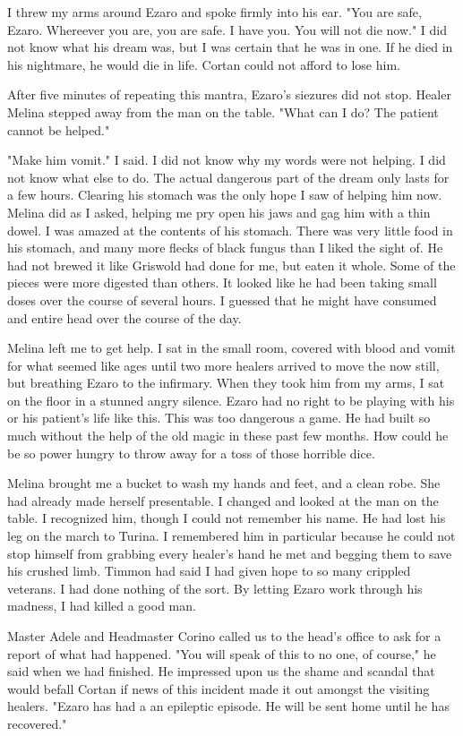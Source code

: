 \documentclass{article}
\begin{document}
I threw my arms around Ezaro and spoke firmly into his ear. "You are safe, Ezaro. Whereever you are, you are safe. I have you. You will not die now." I did not know what his dream was, but I was certain that he was in one. If he died in his nightmare, he would die in life. Cortan could not afford to lose him. 

After five minutes of repeating this mantra, Ezaro's siezures did not stop. Healer Melina stepped away from the man on the table. "What can I do? The patient cannot be helped." 

"Make him vomit." I said. I did not know why my words were not helping. I did not know what else to do. The actual dangerous part of the dream only lasts for a few hours. Clearing his stomach was the only hope I saw of helping him now. Melina did as I asked, helping me pry open his jaws and gag him with a thin dowel. I was amazed at the contents of his stomach. There was very little food in his stomach, and many more flecks of black fungus than I liked the sight of. He had not brewed it like Griswold had done for me, but eaten it whole. Some of the pieces were more digested than others. It looked like he had been taking small doses over the course of several hours. I guessed that he might have consumed and entire head over the course of the day.

Melina left me to get help. I sat in the small room, covered with blood and vomit for what seemed like ages until two more healers arrived to move the now still, but breathing Ezaro to the infirmary. When they took him from my arms, I sat on the floor in a stunned angry silence. Ezaro had no right to be playing with his or his patient's life like this. This was too dangerous a game. He had built so much without the help of the old magic in these past few months. How could he be so power hungry to throw away for a toss of those horrible dice. 

Melina brought me a bucket to wash my hands and feet, and a clean robe. She had already made herself presentable. I changed and looked at the man on the table. I recognized him, though I could not remember his name. He had lost his leg on the march to Turina. I remembered him in particular because he could not stop himself from grabbing every healer's hand he met and begging them to save his crushed limb. Timmon had said I had given hope to so many crippled veterans. I had done nothing of the sort. By letting Ezaro work through his madness, I had killed a good man.

Master Adele and Headmaster Corino called us to the head's office to ask for a report of what had happened. "You will speak of this to no one, of course," he said when we had finished. He impressed upon us the shame and scandal that would befall Cortan if news of this incident made it out amongst the visiting healers. "Ezaro has had a an epileptic episode. He will be sent home until he has recovered."
\end{document}
